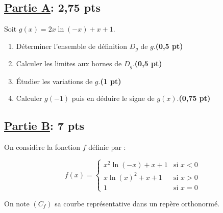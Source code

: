 \documentclass[12pt,a4paper]{article}
\begin{document}
\subsection*{\underline{\textbf{Partie A}}:\textbf{ 2,75 pts}}

Soit \( g(x) = 2x \ln(-x) + x + 1 \).

\begin{enumerate}
    \item Déterminer l’ensemble de définition \( D_g \) de \( g \).\hfill \textbf{(0,5 pt)}
    \item Calculer les limites aux bornes de \( D_g \).\hfill \textbf{(0,5 pt)}
    \item Étudier les variations de \( g \).\hfill \textbf{(1 pt)}
    \item Calculer \( g(-1) \) puis en déduire le signe de \( g(x) \).\hfill \textbf{(0,75 pt)}
\end{enumerate}

\subsection*{\underline{\textbf{Partie B}}:\textbf{ 7 pts}}

On considère la fonction \( f \) définie par :

\[
    f(x) =
    \begin{cases}
        x^2 \ln(-x) + x + 1 & \text{si } x < 0 \\
        x \ln(x)^2 + x + 1  & \text{si } x > 0 \\
        1                   & \text{si } x = 0
    \end{cases}
\]

On note \( (C_f) \) sa courbe représentative dans un repère orthonormé.
\end{document}
